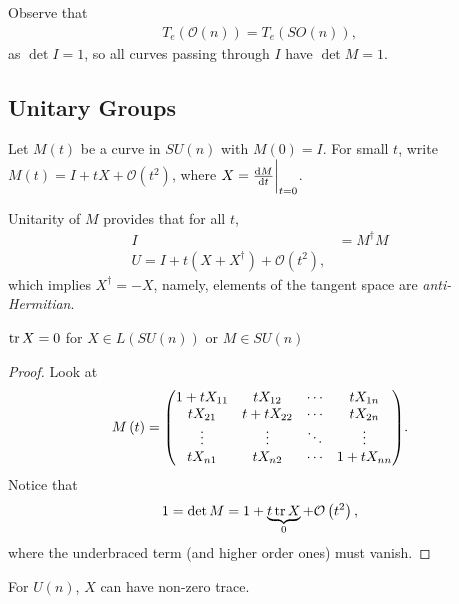 
Observe that
\begin{align}
    T_e \left( \mathcal{O}\left( n \right)  \right) = T_e \left( SO \left( n \right)  \right) 
,\end{align}
as $\det I = 1$, so all curves passing through $I$ have $\det M = 1$.

\subsection{Unitary Groups}



Let $M\left( t \right) $ be a curve in $SU \left( n \right) $ with $ M \left( 0 \right) = I$. For small $t$, write $M \left( t \right) = I + t X + \mathcal{O}\left( t^2 \right) $, where $X = \dv{M}{t} \bigg|_{t=0}$. 

Unitarity of $M$ provides that for all $t$,
\begin{align}
    I &= M^{\dag} M \\
    U = I + t \left( X + X^{\dag} \right) + \mathcal{O}\left( t^2 \right) 
,\end{align}
which implies $X^{\dag} = -X$, namely, elements of the tangent space are \textit{anti-Hermitian}.

\begin{claim}
    $\tr X = 0$ for $X \in L \left( SU \left( n \right)  \right)$ or $M \in SU \left( n \right) $
\end{claim}

\begin{proof}
    Look at
    \begin{align}
        M\left( t \right) = \mqty( 1 + t X_{11} & t X_{12} & \cdots & t X_{1n} \\
        t X_{21} & t + t X_{22} & \cdots & tX_{2n} \\
        \vdots & \vdots & \ddots & \vdots \\
        t X_{n1} & t X_{n2} & \cdots & 1 + t X_{n n} )
    .\end{align}
    Notice that
    \begin{align}
        1 = \det M = 1 + \underbrace{t \tr X}_{0} + \mathcal{O} \left( t^2 \right) 
    ,\end{align}
    where the underbraced term (and higher order ones) must vanish.
\end{proof}

For $U \left( n \right) $, $X$ can have non-zero trace.

